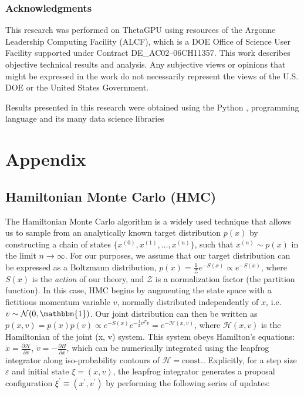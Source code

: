 \documentclass{article} %
\begin{document}
\subsubsection*{Acknowledgments}
This research was performed on ThetaGPU using resources of the Argonne Leadership Computing Facility (ALCF), which is a DOE Office of Science User
Facility supported under Contract DE\_AC02--06CH11357. 
%
This work describes objective technical results and analysis.
%
Any subjective views or opinions that might be expressed in the work do not necessarily represent the views of the U.S.
DOE or the United States Government.
%

Results presented in this research were obtained using the Python \citep{van1995python}, programming language and its many data science libraries \citep{matplotlib,numpyharris2020array,tensorflow2015-whitepaper,seaborn_michael_waskom_2017_883859,ipython4160251}




\appendix
\section{Appendix}
%
\subsection{\label{subsec:HMC}Hamiltonian Monte Carlo (HMC)}
%
The Hamiltonian Monte Carlo algorithm is a widely used technique that allows us to sample from an analytically known
target distribution \(p(x)\) by constructing a chain of states \(\{x^{(0)}, x^{(1)}, \ldots, x^{(n)}\}\), such that
\(x^{(n)}\sim p(x)\) in the limit \(n\rightarrow\infty\).
%
For our purposes, we assume that our target distribution can be expressed as a Boltzmann distribution, \(p(x) =
\tfrac{1}{\mathcal{Z}} e^{-S(x)}\propto e^{-S(x)}\), where \(S(x)\) is the \emph{action} of our theory, and
\(\mathcal{Z}\) is a normalization factor (the partition function).
%
In this case, HMC begins by augmenting the state space with a fictitious momentum variable \(v\), normally
distributed independently of \(x\), i.e.\ \(v\sim\mathcal{N}(0, \mathbbm{1})\).
%
Our joint distribution can then be written as \(%
   p(x, v) = p(x) p(v) \propto e^{-S(x)} e^{-\frac{1}{2}v^{T}v} = e^{-\mathcal{H}(x, v)}
\), where \(\mathcal{H}(x, v)\) is the Hamiltonian of the joint (x, v) system.
%
This system obeys Hamilton's equations: %
\(\dot{x} = \frac{\partial\mathcal{H}}{\partial v}\), \(\dot{v} = -\frac{\partial H}{\partial x}\), which can be 
numerically integrated using the leapfrog integrator along iso-probability contours of \(\mathcal{H} = \text{const.}\).
%
Explicitly, for a step size \(\varepsilon\) and initial state \(\xi = (x, v)\), the leapfrog integrator generates a
proposal configuration \(\xi^{\prime} \equiv (x^{\prime}, v^{\prime})\) by performing the following series of updates: 
%
\end{document}
